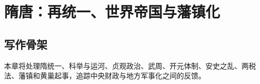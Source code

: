 \chapter{隋唐：再统一、世界帝国与藩镇化}
\section{写作骨架}
本章将处理隋统一、科举与运河、贞观政治、武周、开元体制、安史之乱、两税法、藩镇和黄巢起事，追踪中央财政与地方军事化之间的反馈。
